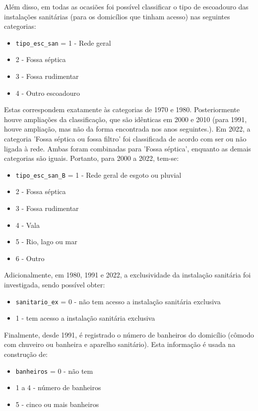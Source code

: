 \documentclass[12pt,a4paper]{article}
\newcommand{\vr}[1]{\texttt{#1}}
\begin{document}
Além disso, em todas as ocasiões foi possível classificar o tipo de escoadouro das instalações sanitárias (para os domicílios que tinham acesso) nas seguintes categorias:
\begin{itemize}
  \item \vr{tipo\_esc\_san} = 1 - Rede geral
  \item 2 - Fossa séptica
  \item 3 - Fossa rudimentar
  \item 4 - Outro escoadouro
\end{itemize}

Estas correspondem exatamente às categorias de 1970 e 1980. Posteriormente houve ampliações da classificação, que são idênticas em 2000 e 2010 (para 1991, houve ampliação, mas não da forma encontrada nos anos seguintes.). Em 2022, a categoria 'Fossa séptica ou fossa filtro' foi classificada de acordo com ser ou não ligada à rede. Ambas foram combinadas para 'Fossa séptica', enquanto as demais categorias são iguais. Portanto, para 2000 a 2022, tem-se:
\begin{itemize}
  \item \vr{tipo\_esc\_san\_B} = 1 - Rede geral de esgoto ou pluvial
  \item 2 - Fossa séptica
  \item 3 - Fossa rudimentar
  \item 4 - Vala
  \item 5 - Rio, lago ou mar
  \item 6 - Outro
\end{itemize}

Adicionalmente, em 1980, 1991 e 2022, a exclusividade da instalação sanitária foi investigada, sendo possível obter:
\begin{itemize}
  \item \vr{sanitario\_ex} = 0 - não tem acesso a instalação sanitária exclusiva
  \item 1 - tem acesso a instalação sanitária exclusiva
\end{itemize}

Finalmente, desde 1991, é registrado o número de banheiros do domicílio (cômodo com chuveiro ou banheira e aparelho sanitário). Esta informação é usada na construção de:
\begin{itemize}
  \item \vr{banheiros} = 0 - não tem
  \item 1 a 4 - número de banheiros
  \item 5 - cinco ou mais banheiros
\end{itemize}
\end{document}

